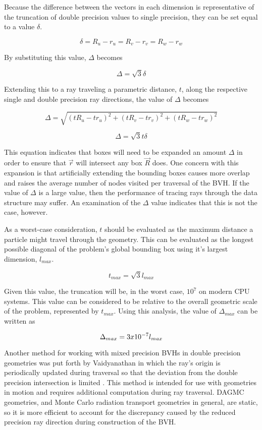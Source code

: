 Because the difference between the vectors in each dimension is representative
of the truncation of double precision values to single precision, they can be
set equal to a value $\delta$.

$$ \delta = R_{u} - r_{u} = R_{v} - r_{v} = R_{w} -  r_{w} $$

By substituting this value, $\Delta$ becomes

$$ \Delta = \sqrt{3} \delta $$

Extending this to a ray traveling a parametric distance, $t$, along the
respective single and double precision ray directions, the value of $\Delta$
becomes

$$ \Delta = \sqrt{ (tR_{u} - tr_{u})^{2} + (tR_{v} - tr_{v})^{2} + (tR_{w} -
  tr_{w})^{2} } $$

$$ \Delta = \sqrt{3} t \delta $$

This equation indicates that boxes will need to be expanded an amount $\Delta$
in order to ensure that $\vec{r}$ will intersect any box $\vec{R}$ does. One
concern with this expansion is that artificially extending the bounding boxes
causes more overlap and raises the average number of nodes visited per traversal
of the BVH. If the value of $\Delta$ is a large value, then the performance of
tracing rays through the data structure may suffer. An examination of the
$\Delta$ value indicates that this is not the case, however.

As a worst-case consideration, $t$ should be evaluated as the maximum distance a
particle might travel through the geometry. This can be evaluated as the longest
possible diagonal of the problem's global bounding box using it's largest
dimension, $l_{max}$.

$$ t_{max} = \sqrt{3} l_{max} $$

Given this value, the truncation will be, in the worst case, $10^{7}$ on modern
CPU systems. This value can be considered to be relative to the overall
geometric scale of the problem, represented by $t_{max}$. Using this analysis,
the value of $\Delta_{max}$ can be written as 

\begin{equation}
  \centering
  \Delta_{max} = 3 x 10^{-7} l_{max}
  \label{eq:box_extension_limit}
\end{equation}

Another method for working with mixed precision BVHs in double precision
geometries was put forth by Vaidyanathan in which the ray's origin is
periodically updated during traversal so that the deviation from the double
precision intersection is limited \cite{Vaidyanathan_2016}. This method is
intended for use with geometries in motion and requires additional computation
during ray traversal. DAGMC geometries, and Monte Carlo radiation transport
geometries in general, are static, so it is more efficient to account for the
discrepancy caused by the reduced precision ray direction during construction of
the BVH.

